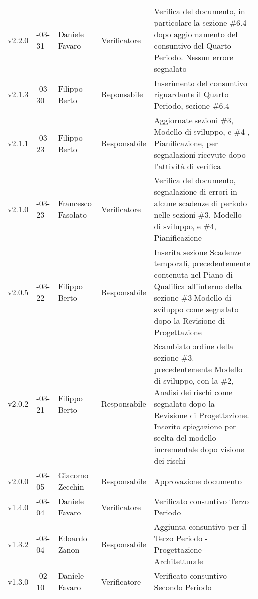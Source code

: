 \begin{longtable} { >{\centering}p{1.4cm} >{\centering}p{2cm} >{\centering}p{2.3cm} >{\centering}p{2.7cm} p{5.5cm} }
		\addlinespace[0.4em]
		\midrule
		\addlinespace[0.4em]
		v2.2.0 & 2017-03-31 & Daniele Favaro & Verificatore & Verifica del documento, in particolare la sezione \#6.4 dopo aggiornamento del consuntivo del Quarto Periodo. Nessun errore segnalato \\ 
		\addlinespace[0.4em]
		\midrule
		\addlinespace[0.4em]
		v2.1.3 & 2017-03-30 & Filippo Berto & Reponsabile & Inserimento del consuntivo riguardante il Quarto Periodo, sezione \#6.4 \\
		\addlinespace[0.4em]
		\midrule
		\addlinespace[0.4em]
		v2.1.1 & 2017-03-23 & Filippo Berto & Responsabile & Aggiornate sezioni \#3, Modello di sviluppo, e \#4 , Pianificazione, per segnalazioni ricevute dopo l'attività di verifica \\ 
		\addlinespace[0.4em]
		\midrule
		\addlinespace[0.4em]
		v2.1.0 & 2017-03-23 & Francesco Fasolato & Verificatore & Verifica del documento, segnalazione di errori in alcune scadenze di periodo nelle sezioni \#3, Modello di sviluppo, e \#4, Pianificazione \\ 
		\addlinespace[0.4em]
		\midrule
		\addlinespace[0.4em]
		v2.0.5 & 2017-03-22 & Filippo Berto & Responsabile & Inserita sezione Scadenze temporali, precedentemente contenuta nel Piano di Qualifica all'interno della sezione \#3 Modello di sviluppo come segnalato dopo la Revisione di Progettazione \\ 
		\addlinespace[0.4em]
		\midrule
		\addlinespace[0.4em]
		v2.0.2 & 2017-03-21 & Filippo Berto & Responsabile & Scambiato ordine della sezione \#3, precedentemente Modello di sviluppo, con la \#2, Analisi dei rischi come segnalato dopo la Revisione di Progettazione. Inserito spiegazione per scelta del modello incrementale dopo visione dei rischi \\ 
		\addlinespace[0.4em]
		\midrule
		\addlinespace[0.4em]		
		v2.0.0 & 2017-03-05 & Giacomo Zecchin & Responsabile & Approvazione documento\\ 
		\addlinespace[0.4em]
		\midrule
		\addlinespace[0.4em]
		v1.4.0 & 2017-03-04 & Daniele Favaro & Verificatore & Verificato consuntivo Terzo Periodo\\ 
		\addlinespace[0.4em]
		\midrule
		\addlinespace[0.4em]	
		v1.3.2 & 2017-03-04 & Edoardo Zanon & Responsabile & Aggiunta consuntivo per il Terzo Periodo - Progettazione Architetturale\\ 
		\addlinespace[0.4em]
		\midrule
		\addlinespace[0.4em]
		v1.3.0 & 2017-02-10 & Daniele Favaro & Verificatore & Verificato consuntivo Secondo Periodo \\ 

\end{longtable}

